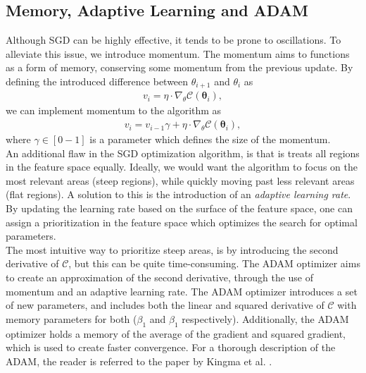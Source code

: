 \subsection{Memory, Adaptive Learning and ADAM}
Although \ac{SGD} can be highly effective, it tends to be prone to oscillations. To alleviate this issue, we introduce momentum. The momentum aims to functions as a form of 
memory, conserving some momentum from the previous update. By defining the introduced difference between $\theta_{i+1}$ and $\theta_{i}$ as 
\begin{align}
    v_i = \eta \cdot \nabla_\theta \mathcal{C}\left(\boldsymbol{\theta}_i\right),
\end{align}
we can implement momentum to the algorithm as 
\begin{align}
    v_i = v_{i-1} \gamma +\eta \cdot \nabla_\theta \mathcal{C}\left(\boldsymbol{\theta}_i\right),
\end{align}
where $\gamma \in [0-1]$ is a parameter which defines the size of the momentum.
\\
An additional flaw in the \ac{SGD} optimization algorithm, is that is treats all regions in the feature space equally. Ideally, we would want the algorithm to focus 
on the most relevant areas (steep regions), while quickly moving past less relevant areas (flat regions). A solution to this is the introduction of an \emph{adaptive learning rate}.
By updating the learning rate based on the surface of the feature space, one can assign a prioritization in the feature space which optimizes the search for optimal parameters.
\\
The most intuitive way to prioritize steep areas, is by introducing the second derivative of $\mathcal{C}$, but this can be quite time-consuming. The \ac{ADAM} optimizer aims to 
create an approximation of the second derivative, through the use of momentum and an adaptive learning rate. The \ac{ADAM} optimizer introduces a set of new parameters, and includes both the 
linear and squared derivative of $\mathcal{C}$ with memory parameters for both ($\beta_1$ and $\beta_1$ respectively). Additionally, the \ac{ADAM} optimizer holds a memory of the average of the 
gradient and squared gradient, which is used to create faster convergence. For a thorough description of the \ac{ADAM}, the reader is referred to the paper by Kingma et al.  \cite{kingma_adam_2017}.
